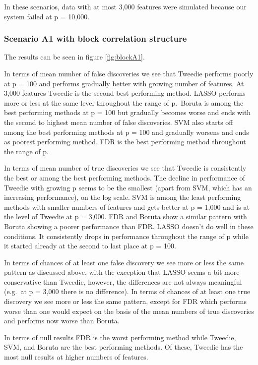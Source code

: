 \documentclass[
]{article}
\begin{document}
In these scenarios, data with at most 3,000 features were simulated because our system failed at p = 10,000.

\hypertarget{scenario-a1-with-block-correlation-structure}{%
\subsubsection{Scenario A1 with block correlation structure}\label{scenario-a1-with-block-correlation-structure}}

The results can be seen in figure \ref{fig:blockA1}.

In terms of mean number of false discoveries we see that Tweedie performs poorly at p = 100 and performs gradually better with growing number of features. At 3,000 features Tweedie is the second best performing method. LASSO performs more or less at the same level throughout the range of p.~Boruta is among the best performing methods at p = 100 but gradually becomes worse and ends with the second to highest mean number of false discoveries. SVM also starts off among the best performing methods at p = 100 and gradually worsens and ends as poorest performing method. FDR is the best performing method throughout the range of p.

In terms of mean number of true discoveries we see that Tweedie is consistently the best or among the best performing methods. The decline in performance of Tweedie with growing p seems to be the smallest (apart from SVM, which has an increasing performance), on the log scale. SVM is among the least performing methods with smaller numbers of features and gets better at p = 1,000 and is at the level of Tweedie at p = 3,000. FDR and Boruta show a similar pattern with Boruta showing a poorer performance than FDR. LASSO doesn't do well in these conditions. It consistently drops in performance throughout the range of p while it started already at the second to last place at p = 100.

In terms of chances of at least one false discovery we see more or less the same pattern as discussed above, with the exception that LASSO seems a bit more conservative than Tweedie, however, the differences are not always meaningful (e.g.~at p = 3,000 there is no difference). In terms of chances of at least one true discovery we see more or less the same pattern, except for FDR which performs worse than one would expect on the basis of the mean numbers of true discoveries and performs now worse than Boruta.

In terms of null results FDR is the worst performing method while Tweedie, SVM, and Boruta are the best performing methods. Of these, Tweedie has the most null results at higher numbers of features.
\end{document}
